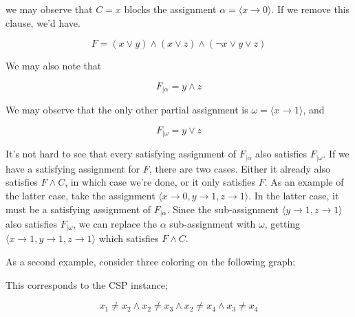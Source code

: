 we may observe that $C = x$ blocks the assignment $\alpha = \langle x \rightarrow 0\rangle$. If we remove this clause, we'd have.

\begin{equation}\label{equation:two-sat-example-pt1-2}
    F = (x \lor y) \land (x \lor z) \land (\neg x \lor y \lor z)
\end{equation}

We may also note that

\begin{equation}\label{equation:two-sat-example-pt1-2}
    F_{|\alpha} = y \land z
\end{equation}

We may observe that the only other partial assignment is $\omega = \langle x \rightarrow 1\rangle$, and

\begin{equation}\label{equation:two-sat-example-pt1-2}
    F_{|\omega} = y \lor z
\end{equation}

It's not hard to see that every satisfying assignment of $F_{|\alpha}$ also satisfies $F_{|\omega}$. If we have a satisfying assignment for $F$, there are two cases. Either it already also satisfies $F \wedge C$, in which case we're done, or it only satisfies $F$. As an example of the latter case, take the assignment $\langle x \rightarrow 0, y \rightarrow 1, z \rightarrow 1\rangle$. In the latter case, it must be a satisfying assignment of $F_{|\alpha}$. Since the sub-assignment $\langle y \rightarrow 1, z \rightarrow 1\rangle$ also satisfies $F_{|\omega}$, we can replace the $\alpha$ sub-assignment with $\omega$, getting $\langle x \rightarrow 1, y \rightarrow 1, z \rightarrow 1\rangle$ which satisfies $F \wedge C$.

As a second example, consider three coloring on the following graph;

\begin{center}
\end{center}

This corresponds to the CSP instance;

\begin{equation}
    x_1 \neq x_2 \wedge x_2 \neq x_3 \wedge x_2 \neq x_4\wedge x_3 \neq x_4 
\end{equation}

